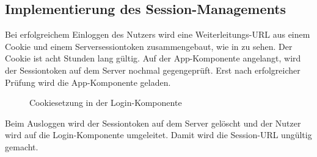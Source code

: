 \subsection{Implementierung des Session-Managements}
\label{sec:Session}

Bei erfolgreichem Einloggen des Nutzers wird eine Weiterleitungs-URL aus einem Cookie und einem Serversessiontoken zusammengebaut, wie in  zu sehen. Der Cookie ist acht Stunden lang gültig. Auf der App-Komponente angelangt, wird der Sessiontoken auf dem Server nochmal gegengeprüft. Erst nach erfolgreicher Prüfung wird die App-Komponente geladen. 
\begin{figure}[htb]
\centering
{}
\caption{Cookiesetzung in der Login-Komponente}
\label{fig:cookie}
\end{figure}
Beim Ausloggen wird der Sessiontoken auf dem Server gelöscht und der Nutzer wird auf die Login-Komponente umgeleitet. Damit wird die Session-URL ungültig gemacht.